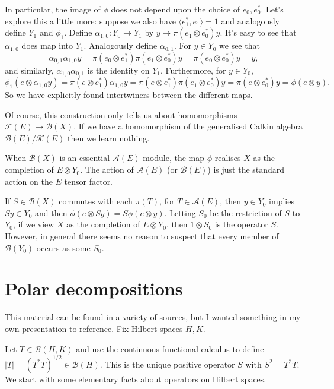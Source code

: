 \documentclass[twoside,a4paper,12pt]{article}
\theoremstyle{plain}
\theoremstyle{definition}
\newcommand{\ip}[2]{\langle #1,#2 \rangle}
\newcommand{\mc}{\mathcal}
\begin{document}
In particular, the image of $\phi$ does not depend upon the choice of $e_0, e_0^*$.  Let's explore this a little more: suppose we also have $\ip{e_1^*}{e_1} = 1$ and analogously define $Y_1$ and $\phi_1$.  Define $\alpha_{1,0} \colon Y_0 \to Y_1$ by $y \mapsto \pi(e_1\otimes e_0^*)y$.  It's easy to see that $\alpha_{1,0}$ does map into $Y_1$.  Analogously define $\alpha_{0,1}$.  For $y\in Y_0$ we see that
\[ \alpha_{0,1} \alpha_{1,0} y = \pi(e_0\otimes e_1^*)\pi(e_1\otimes e_0^*)y
= \pi(e_0\otimes e_0^*)y = y, \]
and similarly, $\alpha_{1,0} \alpha_{0,1}$ is the identity on $Y_1$.  Furthermore, for $y\in Y_0$,
\[ \phi_1(e \otimes \alpha_{1,0}y)
= \pi(e\otimes e_1^*) \alpha_{1,0}y
= \pi(e\otimes e_1^*) \pi(e_1\otimes e_0^*) y
= \pi(e\otimes e_0^*) y = \phi(e\otimes y). \]
So we have explicitly found intertwiners between the different maps.

Of course, this construction only tells us about homomorphisms $\mc F(E) \to \mc B(X)$.  If we have a homomorphism of the generalised Calkin algebra $\mc B(E) / \mc K(E)$ then we learn nothing.

When $\mc B(X)$ is an essential $\mc A(E)$-module, the map $\phi$ realises $X$ as the completion of $E \otimes Y_0$.  The action of $\mc A(E)$ (or $\mc B(E)$) is just the standard action on the $E$ tensor factor.

If $S\in\mc B(X)$ commutes with each $\pi(T)$, for $T\in\mc A(E)$, then $y\in Y_0$ implies $Sy\in Y_0$ and then $\phi(e\otimes Sy) = S\phi(e\otimes y)$.  Letting $S_0$ be the restriction of $S$ to $Y_0$, if we view $X$ as the completion of $E\otimes Y_0$, then $1\otimes S_0$ is the operator $S$.  However, in general there seems no reason to suspect that every member of $\mc B(Y_0)$ occurs as some $S_0$.





\clearpage

\section{Polar decompositions}

This material can be found in a variety of sources, but I wanted something in my own presentation to reference.  Fix Hilbert spaces $H,K$.

Let $T\in\mc B(H,K)$ and use the continuous functional calculus to define $|T| = (T^*T)^{1/2} \in \mc B(H)$.  This is the unique positive operator $S$ with $S^2 = T^*T$.
We start with some elementary facts about operators on Hilbert spaces.
\end{document}
